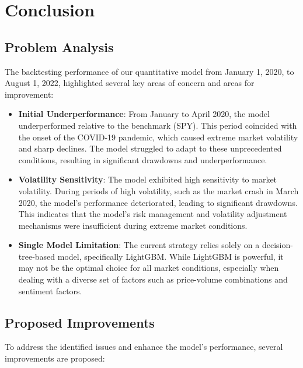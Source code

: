 \documentclass[conference]{IEEEtran}
\begin{document}
\section{\textbf{Conclusion}}

\subsection{\textbf{Problem Analysis}}

The backtesting performance of our quantitative model from January 1, 2020, to August 1, 2022, highlighted several key areas of concern and areas for improvement:

\begin{itemize}
    \item \textbf{Initial Underperformance}: From January to April 2020, the model underperformed relative to the benchmark (SPY). This period coincided with the onset of the COVID-19 pandemic, which caused extreme market volatility and sharp declines. The model struggled to adapt to these unprecedented conditions, resulting in significant drawdowns and underperformance.
    \item \textbf{Volatility Sensitivity}: The model exhibited high sensitivity to market volatility. During periods of high volatility, such as the market crash in March 2020, the model's performance deteriorated, leading to significant drawdowns. This indicates that the model's risk management and volatility adjustment mechanisms were insufficient during extreme market conditions.
    \item \textbf{Single Model Limitation}: The current strategy relies solely on a decision-tree-based model, specifically LightGBM. While LightGBM is powerful, it may not be the optimal choice for all market conditions, especially when dealing with a diverse set of factors such as price-volume combinations and sentiment factors.
\end{itemize}

\subsection{\textbf{Proposed Improvements}}

To address the identified issues and enhance the model's performance, several improvements are proposed:
\end{document}
